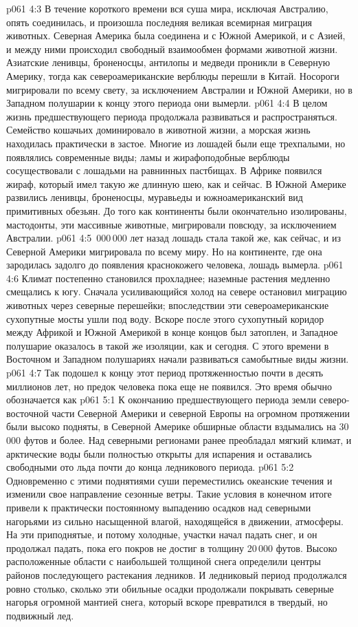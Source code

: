\vs p061 4:3 В течение короткого времени вся суша мира, исключая Австралию, опять соединилась, и произошла последняя великая всемирная миграция животных. Северная Америка была соединена и с Южной Америкой, и с Азией, и между ними происходил свободный взаимообмен формами животной жизни. Азиатские ленивцы, броненосцы, антилопы и медведи проникли в Северную Америку, тогда как североамериканские верблюды перешли в Китай. Носороги мигрировали по всему свету, за исключением Австралии и Южной Америки, но в Западном полушарии к концу этого периода они вымерли.
\vs p061 4:4 В целом жизнь предшествующего периода продолжала развиваться и распространяться. Семейство кошачьих доминировало в животной жизни, а морская жизнь находилась практически в застое. Многие из лошадей были еще трехпалыми, но появлялись современные виды; ламы и жирафоподобные верблюды сосуществовали с лошадьми на равнинных пастбищах. В Африке появился жираф, который имел такую же длинную шею, как и сейчас. В Южной Америке развились ленивцы, броненосцы, муравьеды и южноамериканский вид примитивных обезьян. До того как континенты были окончательно изолированы, мастодонты, эти массивные животные, мигрировали повсюду, за исключением Австралии.
\vs p061 4:5 \,000\,000 лет назад лошадь стала такой же, как сейчас, и из Северной Америки мигрировала по всему миру. Но на континенте, где она зародилась задолго до появления краснокожего человека, лошадь вымерла.
\vs p061 4:6 Климат постепенно становился прохладнее; наземные растения медленно смещались к югу. Сначала усиливающийся холод на севере остановил миграцию животных через северные перешейки; впоследствии эти североамериканские сухопутные мосты ушли под воду. Вскоре после этого сухопутный коридор между Африкой и Южной Америкой в конце концов был затоплен, и Западное полушарие оказалось в такой же изоляции, как и сегодня. С этого времени в Восточном и Западном полушариях начали развиваться самобытные виды жизни.
\vs p061 4:7 \pc Так подошел к концу этот период протяженностью почти в десять миллионов лет, но предок человека пока еще не появился. Это время обычно обозначается как 
\vs p061 5:1 К окончанию предшествующего периода земли северо\hyp{}восточной части Северной Америки и северной Европы на огромном протяжении были высоко подняты, в Северной Америке обширные области вздымались на 30\,000 футов и более. Над северными регионами ранее преобладал мягкий климат, и арктические воды были полностью открыты для испарения и оставались свободными ото льда почти до конца ледникового периода.
\vs p061 5:2 Одновременно с этими поднятиями суши переместились океанские течения и изменили свое направление сезонные ветры. Такие условия в конечном итоге привели к практически постоянному выпадению осадков над северными нагорьями из сильно насыщенной влагой, находящейся в движении, атмосферы. На эти приподнятые, и потому холодные, участки начал падать снег, и он продолжал падать, пока его покров не достиг в толщину 20\,000 футов. Высоко расположенные области с наибольшей толщиной снега определили центры районов последующего растекания ледников. И ледниковый период продолжался ровно столько, сколько эти обильные осадки продолжали покрывать северные нагорья огромной мантией снега, который вскоре превратился в твердый, но подвижный лед.
